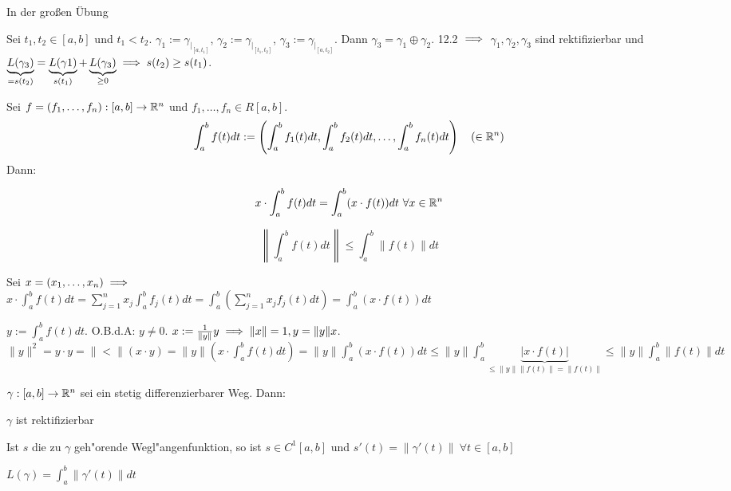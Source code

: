 \documentclass[a4paper,twoside,DIV15,BCOR12mm]{scrbook}
\begin{document}
\begin{beweis}
\begin{liste}
\item In der großen Übung
\item Sei $t_1, t_2 \in [a,b]$ und $t_1<t_2$. $\gamma_1:=\gamma_{|_{[a,t_1]}}$, $\gamma_2:=\gamma_{|_{[t_1,t_2]}}$, $\gamma_3:=\gamma_{|_{[a,t_2]}}$. Dann $\gamma_3 = \gamma_1 \oplus \gamma_2$. 12.2 $\implies$ $\gamma_1,\gamma_2,\gamma_3$ sind rektifizierbar und $\underbrace{L(\gamma_3)}_{=s(t_2)} = \underbrace{L(\gamma1)}_{s(t_1)} + \underbrace{L(\gamma_3)}_{\ge 0} \implies s(t_2) \ge s(t_1)$.
\end{liste}
\end{beweis}

\begin{satz}
Sei $f=(f_1,\ldots,f_n):[a,b]\to\mathbb{R}^n$ und $f_1,\ldots,f_n\in R[a,b]$.
$$\int_a^bf(t)dt := \left(\int_a^bf_1(t)dt, \int_a^bf_2(t)dt,\ldots, \int_a^bf_n(t)dt\right) \quad (\in\mathbb{R}^n)$$
Dann: \begin{liste}
\item $$x\cdot \int_a^bf(t)dt = \int_a^b(x\cdot f(t))dt \ \forall x\in\mathbb{R}^n$$
\item $$\left\|\int_a^bf(t)dt\right\| \le \int_a^b\|f(t)\|dt$$
\end{liste}
\end{satz}

\begin{beweis}
\begin{liste}
\item Sei $x=(x_1,\ldots,x_n) \implies$\\ $x\cdot\int_a^b f(t)dt = \sum_{j=1}^n x_j\int_a^bf_j(t) dt = \int_a^b\left(\sum_{j=1}^n x_j f_j(t)dt\right) = \int_a^b \left(x\cdot f(t)\right) dt$
\item $y:=\int_a^bf(t)dt$. O.B.d.A: $y\ne 0$. $x:= \frac{1}{\|y\|} y \implies \|x\|=1, y=\|y\|x$. $\|y\|^2 = y\cdot y = \|<\|(x\cdot y) = \|y\|\left(x\cdot \int_a^bf(t)dt \right) = \|y\|\int_a^b\left(x\cdot f(t)\right) dt \le \|y\|\int_a^b\underbrace{|x \cdot f(t)|}_{\le\|y\|\|f(t)\| = \|f(t)\|} \le \|y\| \int_a^b\|f(t)\|dt$
\end{liste}
\end{beweis}


\begin{satz}
$\gamma:[a,b]\to\mathbb{R}^n$ sei ein stetig differenzierbarer Weg. Dann:
\begin{liste}
\item $\gamma$ ist rektifizierbar
\item Ist $s$ die zu $\gamma$ geh"orende Wegl"angenfunktion, so ist $s\in C^1[a,b]$ und $s'(t)=\|\gamma'(t)\|\ \forall t\in[a,b]$
\item $L(\gamma)=\int_a^b\|\gamma'(t)\|dt$
\end{liste}
\end{satz}
\end{document}
